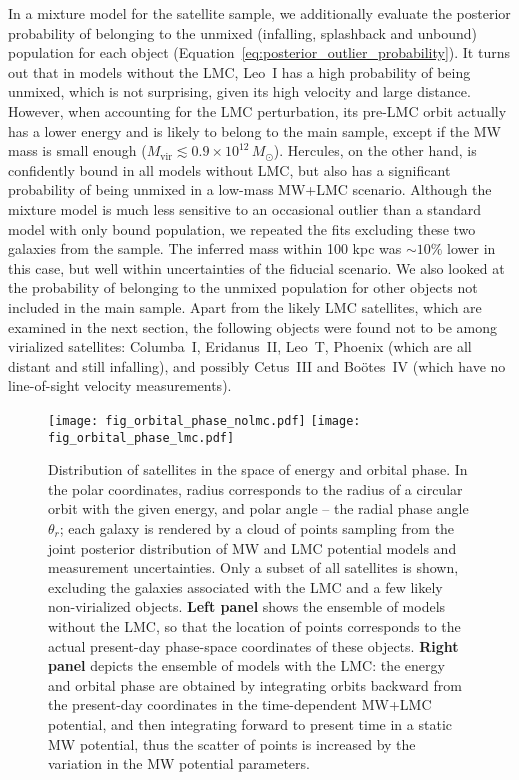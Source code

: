 \documentclass[usenatbib,fleqn]{mnras}
\begin{document}
In a mixture model for the satellite sample, we additionally evaluate the posterior probability of belonging to the unmixed (infalling, splashback and unbound) population for each object (Equation~\ref{eq:posterior_outlier_probability}). It turns out that in models without the LMC, Leo~I has a high probability of being unmixed, which is not surprising, given its high velocity and large distance. However, when accounting for the LMC perturbation, its pre-LMC orbit actually has a lower energy and is likely to belong to the main sample, except if the MW mass is small enough ($M_\text{vir}\lesssim 0.9\times10^{12}\,M_\odot$). Hercules, on the other hand, is confidently bound in all models without LMC, but also has a significant probability of being unmixed in a low-mass MW+LMC scenario. Although the mixture model is much less sensitive to an occasional outlier than a standard model with only bound population, we repeated the fits excluding these two galaxies from the sample. The inferred mass within 100 kpc was $\sim 10\%$ lower in this case, but well within uncertainties of the fiducial scenario.
We also looked at the probability of belonging to the unmixed population for other objects not included in the main sample. Apart from the likely LMC satellites, which are examined in the next section, the following objects were found not to be among virialized satellites: Columba~I, Eridanus~II, Leo~T, Phoenix (which are all distant and still infalling), and possibly Cetus~III and Bo\"otes~IV (which have no line-of-sight velocity measurements).

\begin{figure*}
\texttt{[image: fig\_orbital\_phase\_nolmc.pdf]}\qquad\quad
\texttt{[image: fig\_orbital\_phase\_lmc.pdf]}
\caption{Distribution of satellites in the space of energy and orbital phase. In the polar coordinates, radius corresponds to the radius of a circular orbit with the given energy, and polar angle -- the radial phase angle $\theta_r$; each galaxy is rendered by a cloud of points sampling from the joint posterior distribution of MW and LMC potential models and measurement uncertainties. Only a subset of all satellites is shown, excluding the galaxies associated with the LMC and a few likely non-virialized objects. \textbf{Left panel} shows the ensemble of models without the LMC, so that the location of points corresponds to the actual present-day phase-space coordinates of these objects. \textbf{Right panel} depicts the ensemble of models with the LMC: the energy and orbital phase are obtained by integrating orbits backward from the present-day coordinates in the time-dependent MW+LMC potential, and then integrating forward to present time in a static MW potential, thus the scatter of points is increased by the variation in the MW potential parameters.
}  \label{fig:orbital_phase}
\end{figure*}
\end{document}
